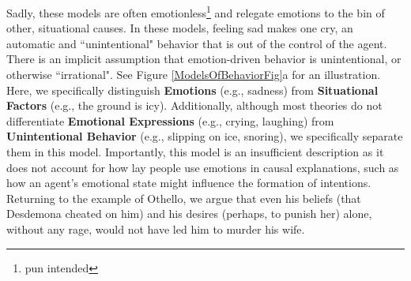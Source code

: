 \documentclass[10pt,letterpaper]{article}
\begin{document}

Sadly, these models are often emotionless\footnote{pun intended} and relegate emotions to the bin of other, situational causes. In these models, feeling sad makes one cry, an automatic and ``unintentional" behavior that is out of the control of the agent. There is an implicit assumption that emotion-driven behavior is unintentional, or otherwise ``irrational". See Figure \ref{ModelsOfBehaviorFig}a for an illustration. Here, we specifically distinguish \textbf{Emotions} (e.g., sadness) from \textbf{Situational Factors} (e.g., the ground is icy). Additionally, although most theories do not differentiate \textbf{Emotional Expressions} (e.g., crying, laughing) from \textbf{Unintentional Behavior} (e.g., slipping on ice, snoring), we specifically separate them in this model. Importantly, this model is an insufficient description as it does not account for how lay people use emotions in causal explanations, such as how an agent's emotional state might influence the formation of intentions. Returning to the example of Othello, we argue that even his beliefs (that Desdemona cheated on him) and his desires (perhaps, to punish her) alone, without any rage, would not have led him to murder his wife. 
\end{document}

